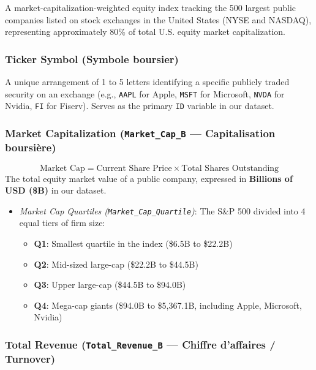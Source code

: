\documentclass[
]{article}
\providecommand{\tightlist}{%
  \setlength{\itemsep}{0pt}\setlength{\parskip}{0pt}}
\begin{document}
A market-capitalization-weighted equity index tracking the 500 largest
public companies listed on stock exchanges in the United States (NYSE
and NASDAQ), representing approximately 80\% of total U.S. equity market
capitalization.

\subsubsection{Ticker Symbol (Symbole
boursier)}\label{ticker-symbol-symbole-boursier}

A unique arrangement of 1 to 5 letters identifying a specific publicly
traded security on an exchange (e.g., \texttt{AAPL} for Apple,
\texttt{MSFT} for Microsoft, \texttt{NVDA} for Nvidia, \texttt{FI} for
Fiserv). Serves as the primary \texttt{ID} variable in our dataset.

\subsubsection{\texorpdfstring{Market Capitalization
(\texttt{Market\_Cap\_B} --- Capitalisation
boursière)}{Market Capitalization (Market\_Cap\_B --- Capitalisation boursière)}}\label{market-capitalization-market_cap_b-capitalisation-boursiuxe8re}

\[\text{Market Cap} = \text{Current Share Price} \times \text{Total Shares Outstanding}\]
The total equity market value of a public company, expressed in
\textbf{Billions of USD (\$B)} in our dataset.

\begin{itemize}
\tightlist
\item
  \emph{Market Cap Quartiles (\texttt{Market\_Cap\_Quartile})}: The S\&P
  500 divided into 4 equal tiers of firm size:

  \begin{itemize}
  \tightlist
  \item
    \textbf{Q1}: Smallest quartile in the index (\$6.5B to \$22.2B)
  \item
    \textbf{Q2}: Mid-sized large-cap (\$22.2B to \$44.5B)
  \item
    \textbf{Q3}: Upper large-cap (\$44.5B to \$94.0B)
  \item
    \textbf{Q4}: Mega-cap giants (\$94.0B to \$5,367.1B, including
    Apple, Microsoft, Nvidia)
  \end{itemize}
\end{itemize}

\subsubsection{\texorpdfstring{Total Revenue (\texttt{Total\_Revenue\_B}
--- Chiffre d'affaires /
Turnover)}{Total Revenue (Total\_Revenue\_B --- Chiffre d'affaires / Turnover)}}\label{total-revenue-total_revenue_b-chiffre-daffaires-turnover}
\end{document}
